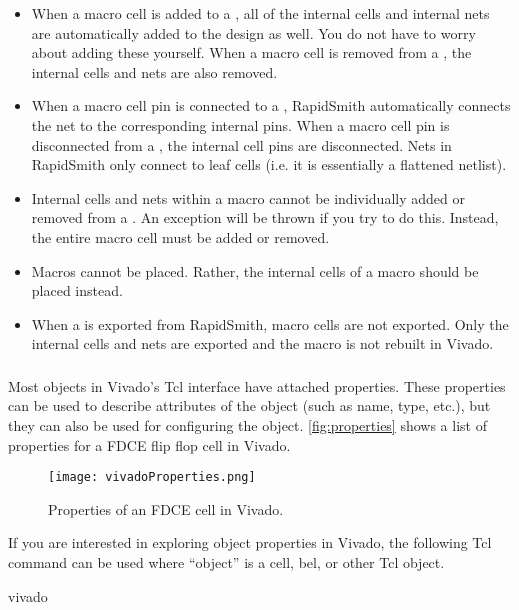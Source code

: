 \begin{itemize}
  \item When a macro cell is added to a , all of the internal
  cells and internal nets are automatically added to the design as well. You do
  not have to worry about adding these yourself. When a macro cell is removed
  from a , the internal cells and nets are also removed.
  \item When a macro cell pin is connected to a \cellnet, RapidSmith
  automatically connects the net to the corresponding internal pins. When a
  macro cell pin is disconnected from a \cellnet, the internal cell pins are
  disconnected. Nets in RapidSmith only connect to leaf cells (i.e. it is
  essentially a flattened netlist).
  \item Internal cells and nets within a macro cannot be individually added or
  removed from a . An exception will be thrown if you try to do
  this. Instead, the entire macro cell must be added or removed.
  \item Macros cannot be placed. Rather, the internal cells of a macro should be
  placed instead.
  \item When a  is exported from RapidSmith, macro cells are not
  exported. Only the internal cells and nets are exported and the macro is not
  rebuilt in Vivado.
\end{itemize}

\subsubsection {}

Most objects in Vivado's Tcl interface have attached properties. These
properties can be used to describe attributes of the object (such as name,
type, etc.), but they can also be used for configuring the object.
\autoref{fig:properties} shows a list of properties for a FDCE flip flop
cell in Vivado.

\begin{figure}[H]
 \centering
 \texttt{[image: vivadoProperties.png]}
 \caption{Properties of an FDCE cell in Vivado.}
 \label{fig:properties}
\end{figure}

\noindent If you are interested in exploring object properties in
Vivado, the following Tcl command can be used where ``object'' is a cell, bel, or
other Tcl object.

\vspace{-.25cm}
\begin {code}
vivado%
\end{code}

